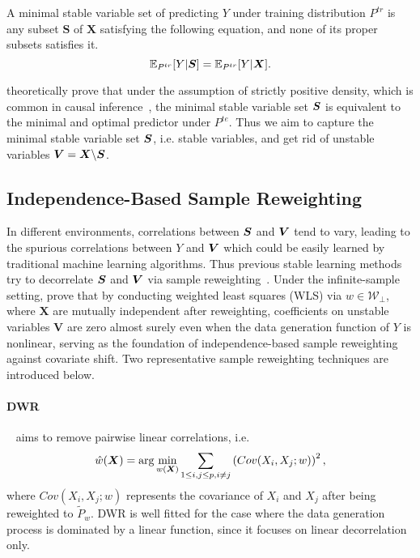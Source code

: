 \begin{definition}  
    A minimal stable variable set of predicting $Y$ under training distribution $P^{tr}$ is any subset $\boldsymbol{S}$ of $\boldsymbol{X}$ satisfying the following equation, and none of its proper subsets satisfies it.
    \begin{equation}
    \small
        \mathbb{E}_{P^{tr}}[Y | \boldsymbol{S}] = \mathbb{E}_{P^{tr}}[Y | \boldsymbol{X}]. \label{eq:stable-set}
    \end{equation}
\end{definition}
\citet{xu2021stable} theoretically prove that under the assumption of strictly positive density, which is common in causal inference~\citep{imbens2015causal}, the minimal stable variable set $\boldsymbol{S}$ is equivalent to the minimal and optimal predictor under $P^{te}$. Thus we aim to capture the minimal stable variable set $\boldsymbol{S}$, i.e. stable variables, and get rid of unstable variables $\boldsymbol{V}=\boldsymbol{X}\backslash\boldsymbol{S}$. 



\subsection{Independence-Based Sample Reweighting}

In different environments, correlations between $\boldsymbol{S}$ and $\boldsymbol{V}$ tend to vary, leading to the spurious correlations between $Y$ and $\boldsymbol{V}$ which could be easily learned by traditional machine learning algorithms. Thus previous stable learning methods try to decorrelate $\boldsymbol{S}$ and $\boldsymbol{V}$ via sample reweighting~\citep{kuang2020stable,shen2020stable,yu2023stable,xu2021stable}. Under the infinite-sample setting, \citet{xu2021stable} prove that by conducting weighted least squares (WLS) via $w\in \mathcal{W}_{\perp}$, where $\boldsymbol{X}$ are mutually independent after reweighting, coefficients on unstable variables $\boldsymbol{V}$ are zero almost surely even when the data generation function of $Y$ is nonlinear, serving as the foundation of independence-based sample reweighting against covariate shift. Two representative sample reweighting techniques are introduced below. 

\paragraph{DWR}~\citep{kuang2020stable} aims to remove pairwise linear correlations, i.e.
\begin{equation} \label{eq:DWR}
\small
    \hat{w}(\boldsymbol{X}) = \arg \min_{w(\boldsymbol{X})} \sum_{1\le i,j \le p, i\ne j}\left(Cov(X_i, X_j; w)\right)^2,
\end{equation}
where $Cov(X_i, X_j; w)$ represents the covariance of $X_i$ and $X_j$ after being reweighted to $\tilde{P}_{w}$. 
DWR is well fitted for the case where the data generation process is dominated by a linear function, since it focuses on linear decorrelation only. 


